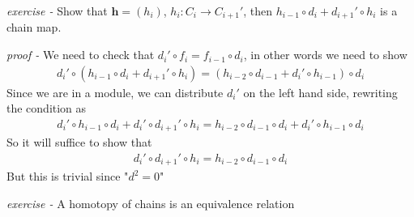\documentclass[11pt]{article}
\theoremstyle{definition}
\begin{document}
\emph{exercise - }\label{CCEx1} Show that \(\mathbf{h} = (h_i)\), \(h_i: C_i \to C_{i+1}'\), then \(h_{i-1}\circ d_i + d_{i+1}' \circ h_i\) is a chain map.

\emph{proof - } We need to check that \(d_i' \circ f_i = f_{i-1} \circ d_i\), in other words we need to show
\begin{align*}
    d_i' \circ (h_{i-1}\circ d_i + d_{i+1}' \circ h_i) = (h_{i-2}\circ d_{i-1} + d_{i}' \circ h_{i-1})\circ d_i
\end{align*}
Since we are in a module, we can distribute \(d_i'\) on the left hand side, rewriting the condition as
\begin{align*}
    d_i' \circ h_{i-1}\circ d_i + d_i' \circ d_{i+1}' \circ h_i = h_{i-2}\circ d_{i-1}\circ d_i + d_{i}' \circ h_{i-1}\circ d_i
\end{align*}
So it will suffice to show that
\begin{align*}
    d_i' \circ d_{i+1}' \circ h_i = h_{i-2}\circ d_{i-1}\circ d_i
\end{align*}
But this is trivial since "\(d^2 = 0\)"




\emph{exercise - }\label{CCEx2} A homotopy of chains is an equivalence relation
\end{document}
